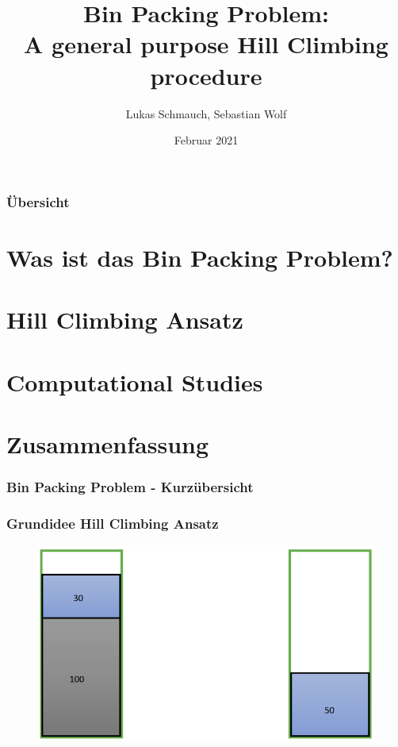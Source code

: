 \documentclass{beamer}
\title[BPP]{Bin Packing Problem:\\ A general purpose Hill Climbing procedure } %
\institute[FSU] %
{ 
Seminar Modern Heuristics \\
Dr. Rico Walter
}
\author{Lukas Schmauch, Sebastian Wolf}
\date{Februar 2021} %
\begin{document}
\begin{frame}
\titlepage %
\end{frame}
\begin{frame}
\frametitle{Übersicht} 
\tableofcontents
\section{Was ist das Bin Packing Problem?} 
\section{Hill Climbing Ansatz} 
\section{Computational Studies}
\section{Zusammenfassung} 
\end{frame}

\begin{frame}
\frametitle{Bin Packing Problem - Kurzübersicht}
\end{frame}
\begin{frame}
\frametitle{Grundidee Hill Climbing Ansatz}

\begin{figure}[!htbp]
\begin{center}
\includegraphics[scale=0.25]{img/bins.png}
\end{center}
\label{fig:architecture}
\end{figure}
\end{frame}
\end{document}
